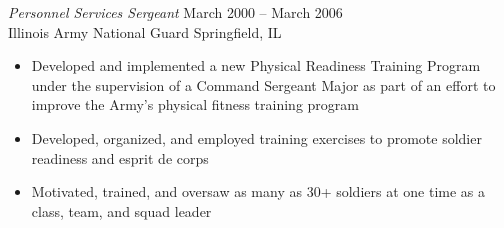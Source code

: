 \documentclass[margin,line]{resume}
\begin{document}
\begin{resume}
{\sl Personnel Services Sergeant}   \hfill   March 2000 -- March 2006\\
Illinois Army National Guard        \hfill   Springfield, IL
\begin{itemize} \itemsep -2pt %
\small\item Developed and implemented a new Physical Readiness Training Program under the supervision of a
            Command Sergeant Major as part of an effort to improve the Army's physical fitness training program
\small\item Developed, organized, and employed training exercises to promote soldier readiness and esprit de corps
\small\item Motivated, trained, and oversaw as many as 30+ soldiers at one time as a class, team, and squad leader
\end{itemize}


\end{resume}
\end{document}
